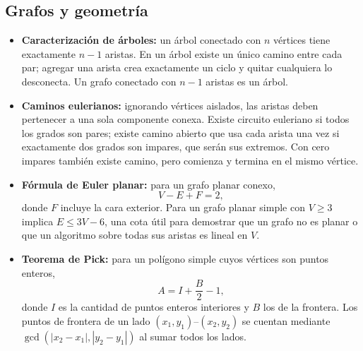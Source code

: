 \subsection{Grafos y geometr\'ia}
\begin{itemize}
  \item \textbf{Caracterizaci\'on de \'arboles:} un \'arbol conectado con $n$
  v\'ertices tiene exactamente $n-1$ aristas. En un \'arbol existe un \'unico
  camino entre cada par; agregar una arista crea exactamente un ciclo y quitar
  cualquiera lo desconecta. Un grafo conectado con $n-1$ aristas es un \'arbol.
  \item \textbf{Caminos eulerianos:} ignorando v\'ertices aislados, las aristas
  deben pertenecer a una sola componente conexa. Existe circuito euleriano si
  todos los grados son pares; existe camino abierto que usa cada arista una vez
  si exactamente dos grados son impares, que ser\'an sus extremos. Con cero
  impares tambi\'en existe camino, pero comienza y termina en el mismo v\'ertice.
  \item \textbf{F\'ormula de Euler planar:} para un grafo planar conexo,
  \[
      V-E+F=2,
  \]
  donde $F$ incluye la cara exterior. Para un grafo planar simple con $V\ge3$
  implica $E\le3V-6$, una cota \'util para demostrar que un grafo no es planar o
  que un algoritmo sobre todas sus aristas es lineal en $V$.
  \item \textbf{Teorema de Pick:} para un pol\'igono simple cuyos v\'ertices son
  puntos enteros,
  \[
      A=I+\frac B2-1,
  \]
  donde $I$ es la cantidad de puntos enteros interiores y $B$ los de la frontera.
  Los puntos de frontera de un lado $(x_1,y_1)$--$(x_2,y_2)$ se cuentan mediante
  $\gcd(|x_2-x_1|,|y_2-y_1|)$ al sumar todos los lados.
\end{itemize}
